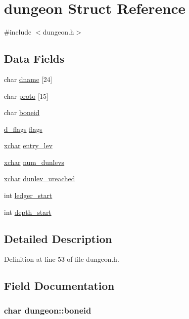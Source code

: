 \hypertarget{structdungeon}{\section{dungeon Struct Reference}
\label{structdungeon}
}


{\ttfamily \#include $<$dungeon.\+h$>$}

\subsection*{Data Fields}
\begin{DoxyCompactItemize}
\item 
char \hyperlink{structdungeon_a802ae61c0d552cf15d77175a8d5b7c5c}{dname} \mbox{[}24\mbox{]}
\item 
char \hyperlink{structdungeon_a527450844fa8523e5f8a67a93c2a7db6}{proto} \mbox{[}15\mbox{]}
\item 
char \hyperlink{structdungeon_a105405e0dbaba92c0de41def0513b280}{boneid}
\item 
\hyperlink{structd__flags}{d\+\_\+flags} \hyperlink{structdungeon_a24aeb7474605b968237cd46e85f5c9cc}{flags}
\item 
\hyperlink{global_8h_a2043b7d01ce89f4ee2fa6c345a752d32}{xchar} \hyperlink{structdungeon_aab3e336020052d328e6f9dc4138eb279}{entry\+\_\+lev}
\item 
\hyperlink{global_8h_a2043b7d01ce89f4ee2fa6c345a752d32}{xchar} \hyperlink{structdungeon_ad99ffcd3ebde29f2a6ec11e033d8f43d}{num\+\_\+dunlevs}
\item 
\hyperlink{global_8h_a2043b7d01ce89f4ee2fa6c345a752d32}{xchar} \hyperlink{structdungeon_ab53e9e80fdf4cfa57d0567a02a02ef76}{dunlev\+\_\+ureached}
\item 
int \hyperlink{structdungeon_a4af2703b566ea1d670677ec37ab8c128}{ledger\+\_\+start}
\item 
int \hyperlink{structdungeon_aad46184797d30fadef5e8428a7717e08}{depth\+\_\+start}
\end{DoxyCompactItemize}


\subsection{Detailed Description}


Definition at line 53 of file dungeon.\+h.



\subsection{Field Documentation}
\hypertarget{structdungeon_a105405e0dbaba92c0de41def0513b280}{
\subsubsection[{boneid}]{\setlength{\rightskip}{0pt plus 5cm}char dungeon\+::boneid}}\label{structdungeon_a105405e0dbaba92c0de41def0513b280}


